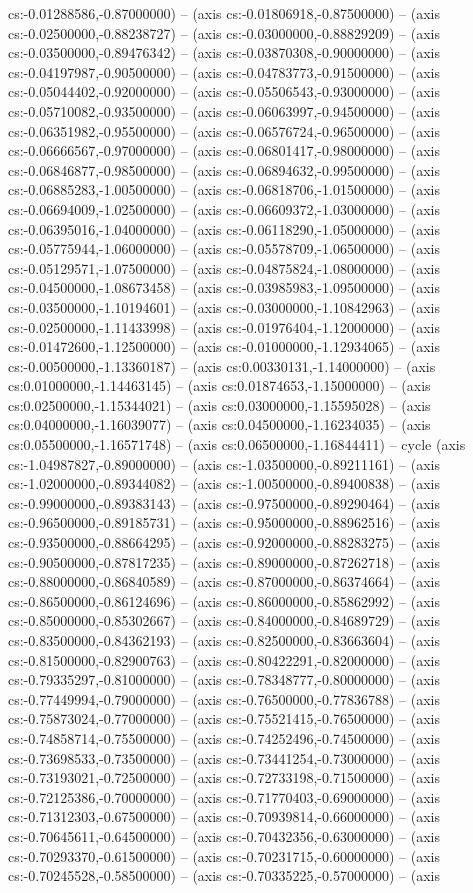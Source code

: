 cs:-0.01288586,-0.87000000) -- (axis cs:-0.01806918,-0.87500000) -- (axis cs:-0.02500000,-0.88238727) -- (axis cs:-0.03000000,-0.88829209) -- (axis cs:-0.03500000,-0.89476342) -- (axis cs:-0.03870308,-0.90000000) -- (axis cs:-0.04197987,-0.90500000) -- (axis cs:-0.04783773,-0.91500000) -- (axis cs:-0.05044402,-0.92000000) -- (axis cs:-0.05506543,-0.93000000) -- (axis cs:-0.05710082,-0.93500000) -- (axis cs:-0.06063997,-0.94500000) -- (axis cs:-0.06351982,-0.95500000) -- (axis cs:-0.06576724,-0.96500000) -- (axis cs:-0.06666567,-0.97000000) -- (axis cs:-0.06801417,-0.98000000) -- (axis cs:-0.06846877,-0.98500000) -- (axis cs:-0.06894632,-0.99500000) -- (axis cs:-0.06885283,-1.00500000) -- (axis cs:-0.06818706,-1.01500000) -- (axis cs:-0.06694009,-1.02500000) -- (axis cs:-0.06609372,-1.03000000) -- (axis cs:-0.06395016,-1.04000000) -- (axis cs:-0.06118290,-1.05000000) -- (axis cs:-0.05775944,-1.06000000) -- (axis cs:-0.05578709,-1.06500000) -- (axis cs:-0.05129571,-1.07500000) -- (axis cs:-0.04875824,-1.08000000) -- (axis cs:-0.04500000,-1.08673458) -- (axis cs:-0.03985983,-1.09500000) -- (axis cs:-0.03500000,-1.10194601) -- (axis cs:-0.03000000,-1.10842963) -- (axis cs:-0.02500000,-1.11433998) -- (axis cs:-0.01976404,-1.12000000) -- (axis cs:-0.01472600,-1.12500000) -- (axis cs:-0.01000000,-1.12934065) -- (axis cs:-0.00500000,-1.13360187) -- (axis cs:0.00330131,-1.14000000) -- (axis cs:0.01000000,-1.14463145) -- (axis cs:0.01874653,-1.15000000) -- (axis cs:0.02500000,-1.15344021) -- (axis cs:0.03000000,-1.15595028) -- (axis cs:0.04000000,-1.16039077) -- (axis cs:0.04500000,-1.16234035) -- (axis cs:0.05500000,-1.16571748) -- (axis cs:0.06500000,-1.16844411) -- cycle (axis cs:-1.04987827,-0.89000000) -- (axis cs:-1.03500000,-0.89211161) -- (axis cs:-1.02000000,-0.89344082) -- (axis cs:-1.00500000,-0.89400838) -- (axis cs:-0.99000000,-0.89383143) -- (axis cs:-0.97500000,-0.89290464) -- (axis cs:-0.96500000,-0.89185731) -- (axis cs:-0.95000000,-0.88962516) -- (axis cs:-0.93500000,-0.88664295) -- (axis cs:-0.92000000,-0.88283275) -- (axis cs:-0.90500000,-0.87817235) -- (axis cs:-0.89000000,-0.87262718) -- (axis cs:-0.88000000,-0.86840589) -- (axis cs:-0.87000000,-0.86374664) -- (axis cs:-0.86500000,-0.86124696) -- (axis cs:-0.86000000,-0.85862992) -- (axis cs:-0.85000000,-0.85302667) -- (axis cs:-0.84000000,-0.84689729) -- (axis cs:-0.83500000,-0.84362193) -- (axis cs:-0.82500000,-0.83663604) -- (axis cs:-0.81500000,-0.82900763) -- (axis cs:-0.80422291,-0.82000000) -- (axis cs:-0.79335297,-0.81000000) -- (axis cs:-0.78348777,-0.80000000) -- (axis cs:-0.77449994,-0.79000000) -- (axis cs:-0.76500000,-0.77836788) -- (axis cs:-0.75873024,-0.77000000) -- (axis cs:-0.75521415,-0.76500000) -- (axis cs:-0.74858714,-0.75500000) -- (axis cs:-0.74252496,-0.74500000) -- (axis cs:-0.73698533,-0.73500000) -- (axis cs:-0.73441254,-0.73000000) -- (axis cs:-0.73193021,-0.72500000) -- (axis cs:-0.72733198,-0.71500000) -- (axis cs:-0.72125386,-0.70000000) -- (axis cs:-0.71770403,-0.69000000) -- (axis cs:-0.71312303,-0.67500000) -- (axis cs:-0.70939814,-0.66000000) -- (axis cs:-0.70645611,-0.64500000) -- (axis cs:-0.70432356,-0.63000000) -- (axis cs:-0.70293370,-0.61500000) -- (axis cs:-0.70231715,-0.60000000) -- (axis cs:-0.70245528,-0.58500000) -- (axis cs:-0.70335225,-0.57000000) -- (axis 